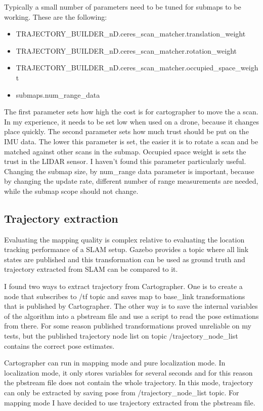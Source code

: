Typically a small number of parameters need to be tuned for submaps to be working. These are the following:
\begin{itemize}
    \item TRAJECTORY\_BUILDER\_nD.ceres\_scan\_matcher.translation\_weight
    \item TRAJECTORY\_BUILDER\_nD.ceres\_scan\_matcher.rotation\_weight
    \item TRAJECTORY\_BUILDER\_nD.ceres\_scan\_matcher.occupied\_space\_weight 
    \item submaps.num\_range\_data
\end{itemize}
The first parameter sets how high the cost is for cartographer to move the a scan. In my experience,
it needs to be set low when used on a drone, because it changes place quickly. The second parameter sets 
how much trust should be put on the IMU data. The lower this parameter is set, the easier it is to 
rotate a scan and be matched against other scans in the submap. Occupied space weight is sets the 
trust in the LIDAR sensor. I haven't found this parameter particularly useful. Changing the submap 
size, by num\_range data parameter is important, because by changing the update rate, different 
number of range measurements are needed, while the submap scope should not change.


\subsection{Trajectory extraction}\label{sect:trajectory_extraction}
Evaluating the mapping quality is complex relative to evaluating the location tracking performance
of a SLAM setup. Gazebo provides a topic where all link states are published and this transformation
can be used as ground truth and trajectory extracted from SLAM can be compared to it.

I found two ways to extract trajectory from Cartographer. One is to create a node that subscribes to
/tf topic and saves map to base\_link transformations that is published by Cartographer. The other
way is to save the internal variables of the algorithm into a pbstream file and use a script to read
the pose estimations from there. For some reason published transformations proved unreliable on my
tests, but the published trajectory node list on topic /trajectory\_node\_list contains the correct
pose estimates.

Cartographer can run in mapping mode and pure localization mode. In localization mode, it
only stores variables for several seconds and for this reason the pbstream file does not contain
the whole trajectory. In this mode, trajectory can only be extracted by saving pose from 
/trajectory\_node\_list topic. For mapping mode I have decided to use trajectory extracted from 
the pbstream file.




